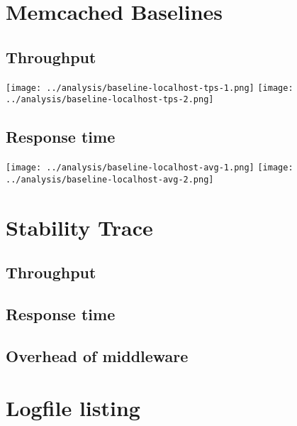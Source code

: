 \documentclass[11pt]{article}
\begin{document}
\section{Memcached Baselines}\label{sec:baseline}


\subsection{Throughput}\label{sec:baseline:tput}

\texttt{[image: ../analysis/baseline-localhost-tps-1.png]}
\texttt{[image: ../analysis/baseline-localhost-tps-2.png]}

\subsection{Response time}\label{sec:baseline:rt}

\texttt{[image: ../analysis/baseline-localhost-avg-1.png]}
\texttt{[image: ../analysis/baseline-localhost-avg-2.png]}


\section{Stability Trace}\label{sec:trace}


\subsection{Throughput}

\subsection{Response time}

\subsection{Overhead of middleware}



\pagebreak

\section*{Logfile listing}
\end{document}
